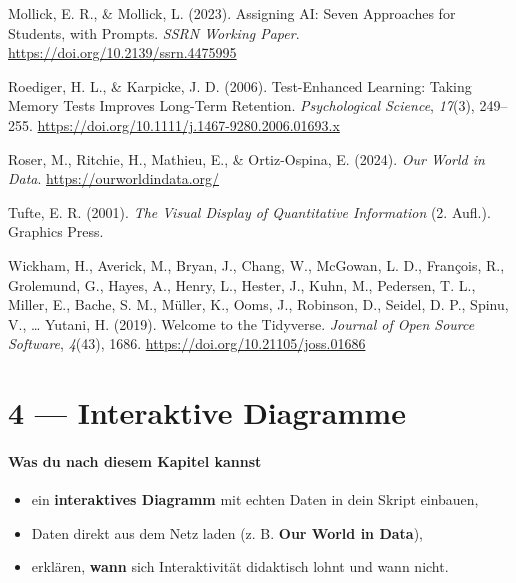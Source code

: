 \documentclass[
  ngerman,
  a4paper,
  DIV=11]{scrreprt}
\newlength{\cslhangindent}
\newenvironment{CSLReferences}[2] %
 {\begin{list}{}{%
  \setlength{\itemindent}{0pt}
  \setlength{\leftmargin}{0pt}
  \setlength{\parsep}{0pt}
  \ifodd #1
   \setlength{\leftmargin}{\cslhangindent}
   \setlength{\itemindent}{-1\cslhangindent}
  \fi
  \setlength{\itemsep}{#2\baselineskip}}}
 {\end{list}}
\providecommand{\tightlist}{%
  \setlength{\itemsep}{0pt}\setlength{\parskip}{0pt}}
\begin{document}
\begin{CSLReferences}{1}{0}
Mollick, E. R., \& Mollick, L. (2023). Assigning {AI}: Seven Approaches
for Students, with Prompts. \emph{SSRN Working Paper}.
\url{https://doi.org/10.2139/ssrn.4475995}

Roediger, H. L., \& Karpicke, J. D. (2006). Test-Enhanced Learning:
Taking Memory Tests Improves Long-Term Retention. \emph{Psychological
Science}, \emph{17}(3), 249--255.
\url{https://doi.org/10.1111/j.1467-9280.2006.01693.x}

Roser, M., Ritchie, H., Mathieu, E., \& Ortiz-Ospina, E. (2024).
\emph{Our World in Data}. \url{https://ourworldindata.org/}

Tufte, E. R. (2001). \emph{The Visual Display of Quantitative
Information} (2. Aufl.). Graphics Press.

Wickham, H., Averick, M., Bryan, J., Chang, W., McGowan, L. D.,
François, R., Grolemund, G., Hayes, A., Henry, L., Hester, J., Kuhn, M.,
Pedersen, T. L., Miller, E., Bache, S. M., Müller, K., Ooms, J.,
Robinson, D., Seidel, D. P., Spinu, V., \ldots{} Yutani, H. (2019).
Welcome to the Tidyverse. \emph{Journal of Open Source Software},
\emph{4}(43), 1686. \url{https://doi.org/10.21105/joss.01686}

\end{CSLReferences}

\chapter{4 --- Interaktive Diagramme}\label{interaktive-diagramme}

\subsubsection{Was du nach diesem Kapitel
kannst}\label{was-du-nach-diesem-kapitel-kannst-4}

\begin{itemize}
\tightlist
\item
  ein \textbf{interaktives Diagramm} mit echten Daten in dein Skript
  einbauen,
\item
  Daten direkt aus dem Netz laden (z. B. \textbf{Our World in Data}),
\item
  erklären, \textbf{wann} sich Interaktivität didaktisch lohnt und wann
  nicht.
\end{itemize}
\end{document}
